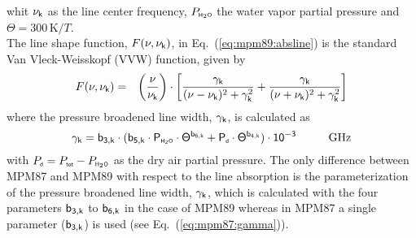 whit $\nu_{\sf k}$ as the line center frequency, $P_{\mbox{\tiny \sf H}_{2}\mbox{\tiny \sf O}}$ the water
vapor partial pressure and $\Theta = 300\,\mbox{K}/T$.\\
The line shape function, $F(\nu,\nu_{\sf k})$, in Eq.~(\ref{eq:mpm89:absline}) 
is the standard Van Vleck-Weisskopf (VVW) function, given by 
\begin{eqnarray}
  \label{eq:mpm89:VVW}
  F(\nu,\nu_{\sf k}) & = & \left(\frac{\nu}{\nu_{\sf k}}\right) \cdot 
               \left[\frac{\gamma_{\sf k}}{(\nu - \nu_{\sf k})^2 + \gamma_{\sf k}^2} + 
                     \frac{\gamma_{\sf k}}{(\nu + \nu_{\sf k})^2 + \gamma_{\sf k}^2}\right]\\
\end{eqnarray}
where the pressure broadened line width, $\gamma_{\sf k}$, is calculated as
\begin{equation}
  \label{eq:mpm89:gamma}
  \gamk = \bdk \cdot 
         (\bfk \cdot \phzo \cdot \Theta^{\bsk} + 
                     \pda  \cdot \Theta^{\bvk})
        \cdot 10^{-3}\hspace*{10mm}\mbox{GHz}
\end{equation}
with $P_{\mbox{\tiny \sf d}}=P_{\mbox{\tiny \sf tot}}-P_{\mbox{\tiny \sf H}_{2}\mbox{\tiny \sf O}}$ as the dry air partial pressure. 
The only difference between MPM87 and MPM89 with respect to the line 
absorption is the parameterization of the pressure broadened line
width, $\gamma_{\sf k}$, which is calculated with the four parameters $\sf b_{\sf 3,k}$ to
$\sf b_{\sf 6,k}$ in the case of MPM89 whereas in MPM87 a single parameter
($\sf b_{\sf 3,k}$) is used (see Eq.~(\ref{eq:mpm87:gamma})).
%

